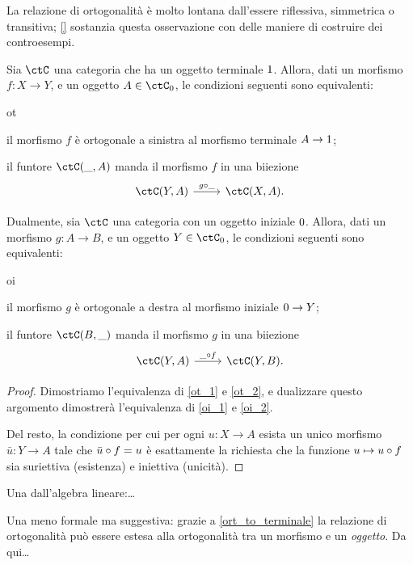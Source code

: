 La relazione di ortogonalità è molto lontana dall'essere riflessiva, simmetrica o transitiva; \ref{} sostanzia questa osservazione con delle maniere di costruire dei controesempi.
\begin{proposition}\label{ort_to_terminale}
	Sia \(\ctC\) una categoria che ha un oggetto terminale \(1\). Allora, dati un morfismo \(f : X\to Y\), e un oggetto \(A\in \ctC_0\), le condizioni seguenti sono equivalenti:
	\begin{enumtag}{ot}
		\item\label{ot_1} il morfismo \(f\) è ortogonale a sinistra al morfismo terminale \(A\to 1\);
		\item\label{ot_2} il funtore \(\Hom{\ctC}(\_,A)\) manda il morfismo \(f\) in una biiezione
		\[\begin{tikzcd}
				\Hom{\ctC}(Y,A) \ar[r, "{g\cmp \_}"] & \Hom{\ctC}(X,A).
			\end{tikzcd}\]
	\end{enumtag}
	Dualmente, sia \(\ctC\) una categoria con un oggetto iniziale \(0\). Allora, dati un morfismo \(g : A\to B\), e un oggetto \(Y\in\ctC_0\), le condizioni seguenti sono equivalenti:
	\begin{enumtag}{oi}
		\item \label{oi_1} il morfismo \(g\) è ortogonale a destra al morfismo iniziale \(0\to Y\);
		\item \label{oi_2} il funtore \(\Hom{\ctC}(B,\_)\) manda il morfismo \(g\) in una biiezione
		\[\begin{tikzcd}
				\Hom{\ctC}(Y,A) \ar[r, "{\_\cmp f}"] & \Hom{\ctC}(Y,B).
			\end{tikzcd}\]
	\end{enumtag}
\end{proposition}
\begin{proof}
	Dimostriamo l'equivalenza di \ref{ot_1} e \ref{ot_2}, e dualizzare questo argomento dimostrerà l'equivalenza di \ref{oi_1} e \ref{oi_2}.

	Del resto, la condizione per cui per ogni \(u : X\to A\) esista un unico morfismo \(\bar u : Y\to A\) tale che \(\bar u\circ f = u\) è esattamente la richiesta che la funzione \(u\mapsto u\circ f\) sia suriettiva (esistenza) e iniettiva (unicità).
\end{proof}
\begin{remark}\label{perche_ortogonale}

	Una dall'algebra lineare:\dots

	Una meno formale ma suggestiva: grazie a \ref{ort_to_terminale} la relazione di ortogonalità può essere estesa alla ortogonalità tra un morfismo e un \emph{oggetto}. Da qui\dots
\end{remark}
